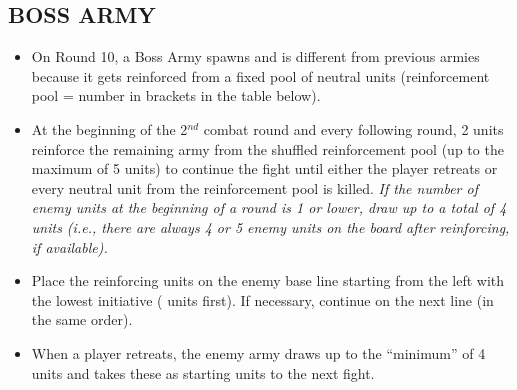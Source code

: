 \begin{multicols*}{2}
\subsection*{\MakeUppercase{Boss Army}}

\begin{itemize}
  \item On Round 10, a Boss Army spawns and is different from previous armies because it gets reinforced from a fixed pool of neutral units (reinforcement pool = number in brackets in the table below).
  \item At the beginning of the 2$^{nd}$ combat round and every following round, 2 units reinforce the remaining army from the shuffled reinforcement pool (up to the maximum of 5 units) to continue the fight until either the player retreats or every neutral unit from the reinforcement pool is killed. \textit{If the number of enemy units at the beginning of a round is 1 or lower, draw up to a total of 4 units (i.e., there are always 4 or 5 enemy units on the board after reinforcing, if available).}
  \item Place the reinforcing units on the enemy base line starting from the left with the lowest initiative ( units first). If necessary, continue on the next line (in the same order).
  \item When a player retreats, the enemy army draws up to the ``minimum'' of 4 units and takes these as starting units to the next fight.
\end{itemize}

\end{multicols*}

